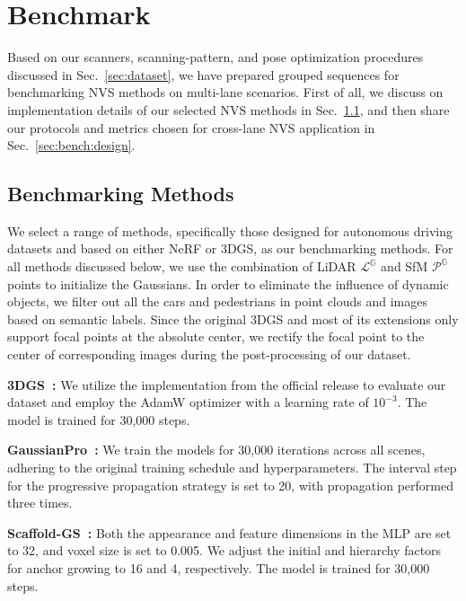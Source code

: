 \section{Benchmark}

Based on our scanners, scanning-pattern, and pose optimization procedures discussed in Sec.~\ref{sec:dataset}, we have prepared grouped sequences for benchmarking NVS methods on multi-lane scenarios. First of all, we discuss on implementation details of our selected NVS methods in Sec.~\ref{sec:bench:methods}, and then share our protocols and metrics chosen for cross-lane NVS application in Sec.~\ref{sec:bench:design}.

\subsection{Benchmarking Methods}
\label{sec:bench:methods}

We select a range of methods, specifically those designed for autonomous driving datasets and based on either NeRF or 3DGS, as our benchmarking methods.
For all methods discussed below, we use the combination of LiDAR $\mathcal{L}^\mathbb{G}$ and SfM $\mathcal{P}^\mathbb{G}$ points to initialize the Gaussians. 
In order to eliminate the influence of dynamic objects, we filter out all the cars and pedestrians in point clouds and images based on semantic labels.
Since the original 3DGS and most of its extensions only support focal points at the absolute center, we rectify the focal point to the center of corresponding images during the post-processing of our dataset.

\textbf{3DGS~\cite{Kerbl20233dgs}:} 
We utilize the implementation from the official release to evaluate our dataset and employ the AdamW optimizer with a learning rate of \(10^{-3}\). The model is trained for 30,000 steps.

\textbf{GaussianPro~\cite{cheng2024gaussianpro}:} 
We train the models for 30,000 iterations across all scenes, adhering to the original training schedule and hyperparameters. The interval step for the progressive propagation strategy is set to 20, with propagation performed three times. 

\textbf{Scaffold-GS~\cite{Lu2024scaffoldgs}:} 
Both the appearance and feature dimensions in the MLP are set to 32, and voxel size is set to 0.005. We adjust the initial and hierarchy factors for anchor growing to 16 and 4, respectively. The model is trained for 30,000 steps.

